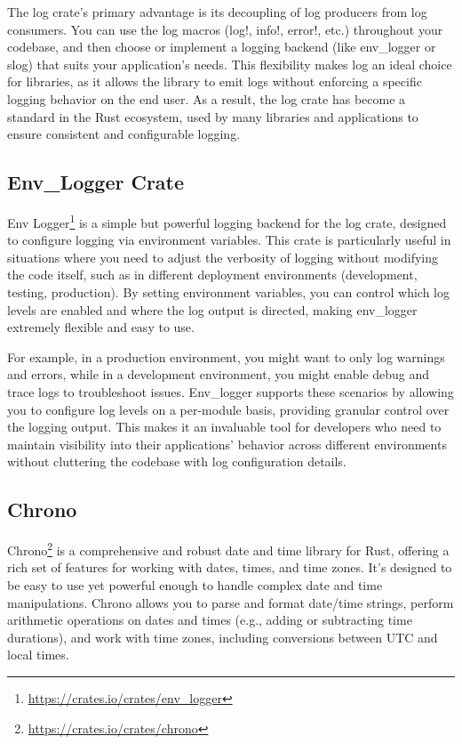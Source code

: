 The log crate’s primary advantage is its decoupling of log producers from log consumers. You can use the log macros (log!, info!, error!, etc.) throughout your codebase, and then choose or implement a logging backend (like env\_logger or slog) that suits your application's needs. This flexibility makes log an ideal choice for libraries, as it allows the library to emit logs without enforcing a specific logging behavior on the end user. As a result, the log crate has become a standard in the Rust ecosystem, used by many libraries and applications to ensure consistent and configurable logging.

\subsection{Env\_Logger Crate}

Env Logger\footnote{\url{https://crates.io/crates/env_logger}} is a simple but powerful logging backend for the log crate, designed to configure logging via environment variables. This crate is particularly useful in situations where you need to adjust the verbosity of logging without modifying the code itself, such as in different deployment environments (development, testing, production). By setting environment variables, you can control which log levels are enabled and where the log output is directed, making env\_logger extremely flexible and easy to use.

For example, in a production environment, you might want to only log warnings and errors, while in a development environment, you might enable debug and trace logs to troubleshoot issues. Env\_logger supports these scenarios by allowing you to configure log levels on a per-module basis, providing granular control over the logging output. This makes it an invaluable tool for developers who need to maintain visibility into their applications’ behavior across different environments without cluttering the codebase with log configuration details.

\subsection{Chrono}

Chrono\footnote{\url{https://crates.io/crates/chrono}} is a comprehensive and robust date and time library for Rust, offering a rich set of features for working with dates, times, and time zones. It’s designed to be easy to use yet powerful enough to handle complex date and time manipulations. Chrono allows you to parse and format date/time strings, perform arithmetic operations on dates and times (e.g., adding or subtracting time durations), and work with time zones, including conversions between UTC and local times.

